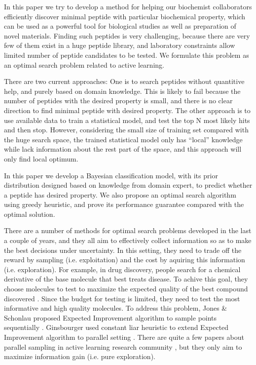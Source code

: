 \documentclass[opre,nonblindrev]{informs3} %
\begin{document}
In this paper we try to develop a method for helping our biochemist collaborators efficiently discover minimal peptide with particular biochemical property, which can be used as a powerful tool for biological studies as well as preparation of novel materials. Finding such peptides is very challenging, because there are very few of them exist in a huge peptide library, and laboratory constraints allow limited number of peptide candidates to be tested. We formulate this problem as an
optimal search problem related to active learning.

There are two current approaches: One is to search peptides without quantitive help, and purely based on domain knowledge. This is likely to fail because the number of peptides with the desired property is small, and there is no clear direction to find minimal peptide with desired property. The other approach is to use available data to train a statistical model, and test the top N most likely hits and then stop. However, considering the small size of training set compared with the huge
search space, the trained statistical model only has ``local'' knowledge while lack information about the rest part of the space, and this approach will only find local optimum.

In this paper we develop a Bayesian classification model, with its prior distribution designed based on knowledge from domain expert, to predict whether a peptide has desired property. We also propose an optimal search algorithm using greedy heuristic, and prove its performance guarantee compared with the optimal solution.

There are a number of methods for optimal search problems developed in the last a couple of years, and they all aim to effectively collect information so as to make the best decisions under uncertainty. In this setting, they need to trade off the reward by sampling (i.e. exploitation) and the cost by aquiring this information (i.e. exploration). For example, in drug discovery, people search for a chemical derivative of the base molecule that best treats disease. To achive this goal, they choose molecules to test  to maximize the expected quality of the
best compound discovered \citep{Negoescu2010}. Since the budget for testing is limited, they need to test the most informative and high quality molecules. To address this problem, Jones \& Schonlau proposed Expected Improvement algorithm to sample points sequentially \citep{Jones1998} . Ginsbourger used constant liar heuristic to extend Expected Improvement algorithm to parallel setting \citep{Ginsbourger2008} . There are quite a few papers about parallel sampling in active learning research
community \citep{Chen2013, Hoi2006, Hoi2006a} , but they only aim to maximize information gain (i.e. pure exploration).
\end{document}
